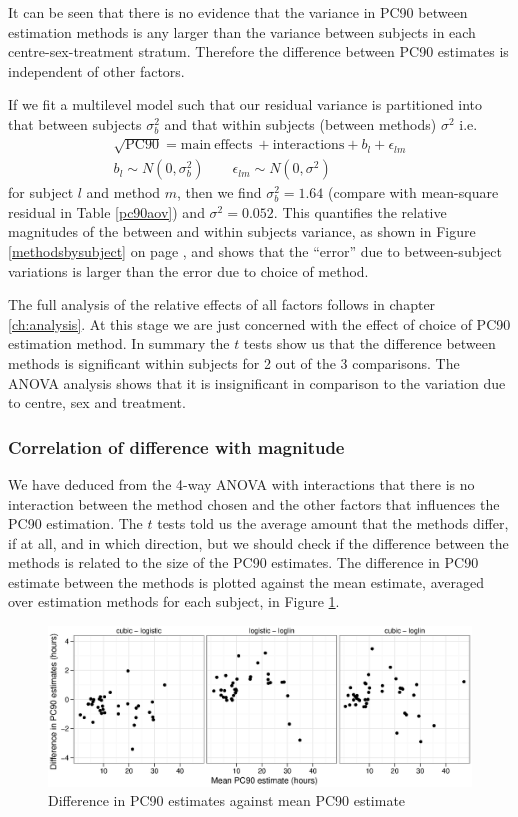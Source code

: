 It can be seen that there is no evidence that the variance in PC90 between estimation methods is any larger than the variance between subjects in each centre-sex-treatment stratum. Therefore the difference between PC90 estimates is independent of other factors.

If we fit a multilevel model such that our residual variance is partitioned into that between subjects $\sigma_{b}^{2}$ and that within subjects (between methods) $\sigma^{2}$ i.e.
\begin{eqnarray*}
\sqrt{\mathrm{PC}90}=\mathrm{main\ effects\ + interactions} + b_{l} + \epsilon_{lm}\\
b_{l}\sim N(0,\sigma_{b}^{2})\quad\quad\epsilon_{lm}\sim N(0,\sigma^{2})\label{methods.lme}
\end{eqnarray*}
for subject $l$ and method $m$, then we find $\sigma_{b}^{2}=1.64$ (compare with mean-square residual in Table \ref{pc90aov}) and $\sigma^{2}=0.052$. This quantifies the relative magnitudes of the between and within subjects variance, as shown in Figure \ref{methodsbysubject} on page \pageref{methodsbysubject}, and shows that the ``error'' due to between-subject variations is larger than the error due to choice of method.

The full analysis of the relative effects of all factors follows in chapter \ref{ch:analysis}. At this stage we are just concerned with the effect of choice of PC90 estimation method. In summary the $t$ tests show us that the difference between methods is significant within subjects for 2 out of the 3 comparisons. The ANOVA analysis shows that it is insignificant in comparison to the variation due to centre, sex and treatment.
\subsubsection*{Correlation of difference with magnitude}
We have deduced from the 4-way ANOVA with interactions that there is no interaction between the method chosen and the other factors that influences the PC90 estimation. The $t$ tests told us the average amount that the methods differ, if at all, and in which direction, but we should check if the difference between the methods is related to the size of the PC90 estimates. The difference in PC90 estimate between the methods is plotted against the mean estimate, averaged over estimation methods for each subject, in Figure \ref{pc90est-cor}.
\begin{figure}[h]
\includegraphics[width=150mm]{pc90est-cor.eps} 
\caption{Difference in PC90 estimates against mean PC90 estimate}
\label{pc90est-cor}
\end{figure}

